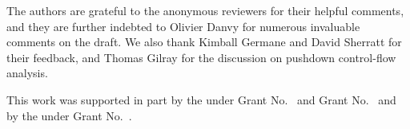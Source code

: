 \documentclass[acmsmall, screen]{acmart}\settopmatter{}
\begin{document}
\begin{acks}                            %
  The authors are grateful to the anonymous reviewers for their
  helpful comments, and they are further indebted to Olivier Danvy
  for numerous invaluable comments on the draft. We also thank
  Kimball Germane and David Sherratt for their feedback, and
  Thomas Gilray for the discussion on pushdown control-flow analysis.

  This work was supported in part by the
   under Grant
  No.~ and Grant
  No.~ and by the
   under Grant
  No.~.  
\end{acks}




\end{document}

